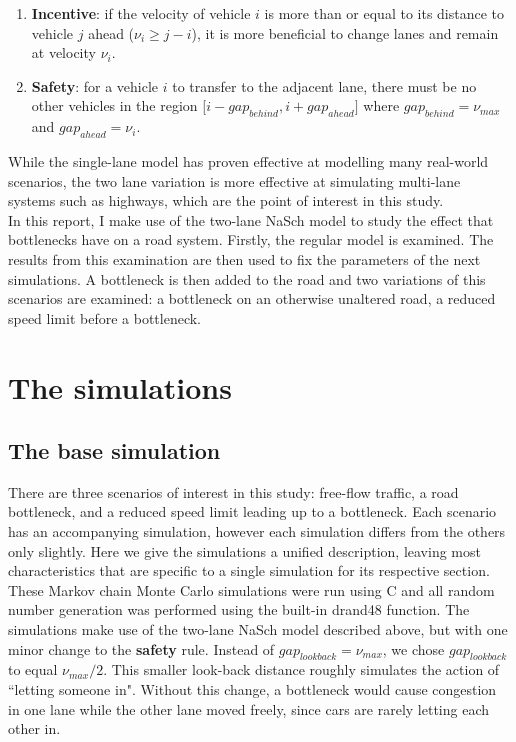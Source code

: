 \documentclass[11pt]{article}
\begin{document}
	\begin{enumerate}
		\item \textbf{Incentive}: if the velocity of vehicle $i$ is more than or equal to its distance to vehicle $j$ ahead ($\nu_i \geq j-i$), it is more beneficial to change lanes and remain at velocity $\nu_i$.
		\item \textbf{Safety}: for a vehicle $i$ to transfer to the adjacent lane, there must be no other vehicles in the region [$i-gap_{behind}, i+gap_{ahead}]$ where $gap_{behind} = \nu_{max}$ and $gap_{ahead} = \nu_i$.
	\end{enumerate}
	
	While the single-lane model has proven effective at modelling many real-world scenarios, the two lane variation is more effective at simulating multi-lane systems such as highways, which are the point of interest in this study.\\ 
	
	In this report, I make use of the two-lane NaSch model to study the effect that bottlenecks have on a road system. Firstly, the regular model is examined. The results from this examination are then used to fix the parameters of the next simulations. A bottleneck is then added to the road and two variations of this scenarios are examined: a bottleneck on an otherwise unaltered road, a reduced speed limit before a bottleneck.\\
	
	\section{The simulations}\label{sec:sims}
	
	\subsection{The base simulation}\label{subsec:basesim}
	
	There are three scenarios of interest in this study: free-flow traffic, a road bottleneck, and a reduced speed limit leading up to a bottleneck. Each scenario has an accompanying simulation, however each simulation differs from the others only slightly. Here we give the simulations a unified description, leaving most characteristics that are specific to a single simulation for its respective section.\\
	
	These Markov chain Monte Carlo simulations were run using C and all random number generation was performed using the built-in drand48 function. The simulations make use of the two-lane NaSch model described above, but with one minor change to the \textbf{safety} rule. Instead of $gap_{lookback} = \nu_{max}$, we chose $gap_{lookback}$ to equal $\nu_{max}/2$. This smaller look-back distance roughly simulates the action of ``letting someone in". Without this change, a bottleneck would cause congestion in one lane while the other lane moved freely, since cars are rarely letting each other in. \\
	
\end{document}
